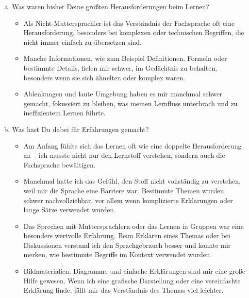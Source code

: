 \documentclass[10pt, oneside]{article}
\begin{document}
\begin{enumerate}[(a)]
    \item Was waren bisher Deine größten Herausforderungen beim Lernen?

        \begin{itemize}
            \item Als Nicht-Muttersprachler ist das Verständnis der Fachsprache
                oft eine Herausforderung, besonders bei komplexen oder
                technischen Begriffen, die nicht immer einfach zu übersetzen
                sind.
            \item Manche Informationen, wie zum Beispiel Definitionen, Formeln
                oder bestimmte Details, fielen mir schwer, im Gedächtnis zu
                behalten, besonders wenn sie sich ähnelten oder komplex waren.
            \item Ablenkungen und laute Umgebung haben es mir manchmal schwer
                gemacht, fokussiert zu bleiben, was meinen Lernfluss unterbrach
                und zu ineffizientem Lernen führte.
        \end{itemize}

    \item Was hast Du dabei für Erfahrungen gemacht?

        \begin{itemize}
            \item Am Anfang fühlte sich das Lernen oft wie eine doppelte
                Herausforderung an – ich musste nicht nur den Lernstoff
                verstehen, sondern auch die Fachsprache bewältigen.
            \item Manchmal hatte ich das Gefühl, den Stoff nicht vollständig zu
                verstehen, weil mir die Sprache eine Barriere war. Bestimmte
                Themen wurden schwer nachvollziehbar, vor allem wenn
                komplizierte Erklärungen oder lange Sätze verwendet wurden.
            \item Das Sprechen mit Muttersprachlern oder das Lernen in Gruppen
                war eine besonders wertvolle Erfahrung. Beim Erklären eines
                Themas oder bei Diskussionen verstand ich den Sprachgebrauch
                besser und konnte mir merken, wie bestimmte Begriffe im Kontext
                verwendet wurden.
            \item Bildmaterialien, Diagramme und einfache Erklärungen sind mir
                eine große Hilfe gewesen. Wenn ich eine grafische Darstellung
                oder eine vereinfachte Erklärung finde, fällt mir das
                Verständnis des Themas viel leichter.
        \end{itemize}


\end{enumerate}
\end{document}
